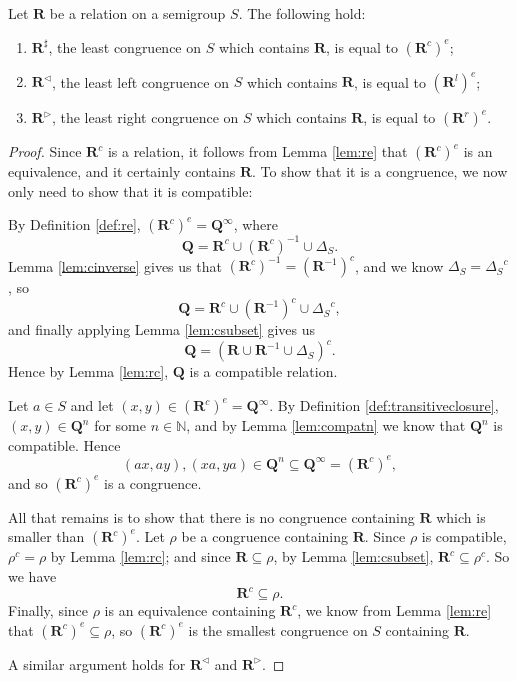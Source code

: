 \begin{theorem}
  \label{thm:rsharp}
  Let $\mathbf{R}$ be a relation on a semigroup $S$.
  The following hold:
  \begin{enumerate}[\rm(1)]
  \item $\mathbf{R}^\sharp$, the least congruence on $S$ which contains
    $\mathbf{R}$, is equal to $(\mathbf{R}^c)^e$;
  \item $\mathbf{R}^\triangleleft$, the least left congruence on $S$ which
    contains $\mathbf{R}$, is equal to $(\mathbf{R}^l)^e$;
  \item $\mathbf{R}^\triangleright$, the least right congruence on $S$ which
    contains $\mathbf{R}$, is equal to $(\mathbf{R}^r)^e$.
  \end{enumerate}
  \begin{proof}
    Since $\mathbf{R}^c$ is a relation, it follows from Lemma \ref{lem:re} that
    $(\mathbf{R}^c)^e$ is an equivalence, and it certainly contains
    $\mathbf{R}$.  To show that it is a congruence, we now only need to show
    that it is compatible:

    By Definition \ref{def:re}, $(\mathbf{R}^c)^e = \mathbf{Q}^\infty$, where
    $$\mathbf{Q} =
    \mathbf{R}^c \cup
    (\mathbf{R}^c)^{-1} \cup
    \Delta_S.$$
    Lemma \ref{lem:cinverse} gives us that
    $(\mathbf{R}^c)^{-1} = (\mathbf{R}^{-1})^c$, and
    we know
    $\Delta_S = {\Delta_S}^c$, so
    $$\mathbf{Q} =
    \mathbf{R}^c \cup
    (\mathbf{R}^{-1})^c \cup
    {\Delta_S}^c,$$
    and finally applying Lemma \ref{lem:csubset} gives us
    $$\mathbf{Q} =
    (\mathbf{R} \cup \mathbf{R}^{-1} \cup \Delta_S)^c.$$
    Hence by Lemma \ref{lem:rc}, $\mathbf{Q}$ is a compatible relation.

    Let $a \in S$ and let $(x,y) \in (\mathbf{R}^c)^e = \mathbf{Q}^\infty$.
    By Definition \ref{def:transitiveclosure}, $(x,y) \in \mathbf{Q}^n$ for some
    $n \in \mathbb{N}$, and by Lemma \ref{lem:compatn} we know that
    $\mathbf{Q}^n$ is compatible.  Hence
    $$(ax,ay), (xa, ya) \in \mathbf{Q}^n \subseteq \mathbf{Q}^\infty =
    (\mathbf{R}^c)^e,$$ and so $(\mathbf{R}^c)^e$ is a congruence.

    All that remains is to show that there is no congruence containing
    $\mathbf{R}$ which is smaller than $(\mathbf{R}^c)^e$.
    Let $\rho$ be a congruence containing $\mathbf{R}$.  Since $\rho$ is
    compatible, $\rho^c = \rho$ by Lemma \ref{lem:rc}; and since $\mathbf{R}
    \subseteq \rho$, by Lemma \ref{lem:csubset}, $\mathbf{R}^c \subseteq
    \rho^c$.  So we have
    $$\mathbf{R}^c \subseteq \rho.$$
    Finally, since $\rho$ is an equivalence containing $\mathbf{R}^c$, we know
    from Lemma \ref{lem:re} that $(\mathbf{R}^c)^e \subseteq \rho$, so
    $(\mathbf{R}^c)^e$ is the smallest congruence on $S$ containing
    $\mathbf{R}$. \cite[p.26-27]{howie}

    A similar argument holds for $\mathbf{R}^\triangleleft$ and
    $\mathbf{R}^\triangleright$.
  \end{proof}
\end{theorem}

